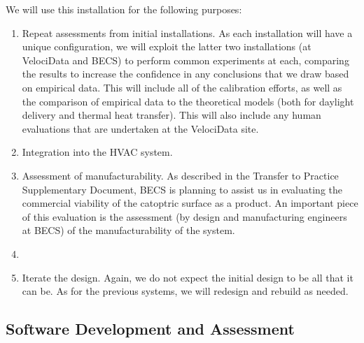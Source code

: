 We will use this installation for the following purposes:

\begin{enumerate}

\item Repeat assessments from initial installations.
As each installation will have a unique configuration, we will exploit the
latter two installations (at VelociData and BECS) to perform common
experiments at each, comparing the results to increase the confidence
in any conclusions that we draw based on empirical data.
This will include all of the calibration efforts, as well as the comparison
of empirical data to the theoretical models (both for daylight delivery
and thermal heat transfer).
This will also include any human evaluations that are undertaken at
the VelociData site.

\item Integration into the HVAC system.

\item Assessment of manufacturability.
As described in the Transfer to Practice Supplementary Document, BECS
is planning to assist us in evaluating the commercial viability of the
catoptric surface as a product.  An important piece of this evaluation is
the assessment (by design and manufacturing engineers at BECS) of the
manufacturability of the system.

\item {}

\item Iterate the design. Again, we do not expect the initial design
to be all that it can be. As for the previous systems, we will redesign
and rebuild as needed.

\end{enumerate}

\subsection{Software Development and Assessment}

